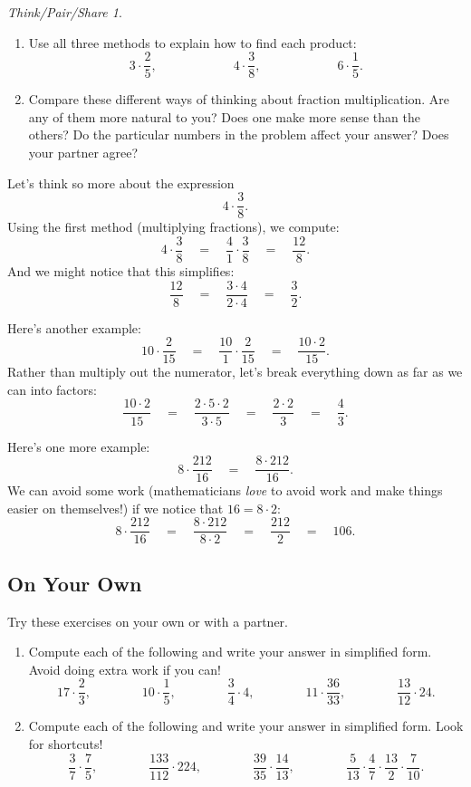 \documentclass[10pt, reqno]{amsart}
\theoremstyle{remark}
\newtheorem*{thinkpair*}{Think/Pair/Share}
\theoremstyle{definition}
\numberwithin{equation}{section}  %
\begin{document}
\begin{thinkpair*}\ 
\begin{enumerate}
\item
Use all three methods to explain how to find each product:
\[
3 \cdot \frac 2 5 ,
\qquad\qquad\qquad
4 \cdot \frac 3 8 ,
\qquad\qquad\qquad
6 \cdot \frac 1 5.
\]

\item
Compare these different ways of thinking about fraction multiplication.  Are any of them more natural to you?  Does one make more sense than the others?  Do the particular numbers in the problem affect your answer?  Does your partner agree?
\end{enumerate}
\end{thinkpair*}


Let's think so more about the expression 
\[
4 \cdot \frac 38.
\]
Using the first method (multiplying fractions), we compute:
\[
4 \cdot \frac 38 
\quad
=
\quad
 \frac 41 \cdot \frac 38
 \quad
  = 
  \quad
  \frac{12}8.
\]
And we might notice that this simplifies:
\[
\frac{12}8 
\quad
=
\quad
 \frac{3\cdot 4}{2\cdot 4} 
 \quad
 = 
 \quad
 \frac 32.
\]

Here's another example:
\[
10 \cdot \frac 2{15} 
\quad
=
\quad
 \frac{10} 1 \cdot \frac 2{15} 
\quad
= 
\quad
\frac{10\cdot 2}{15}.
\]
Rather than multiply out the numerator, let's break everything down as far as we can into factors:
\[
 \frac{10\cdot 2}{15} 
 \quad
=
\quad
\frac{2\cdot 5 \cdot 2}{3\cdot 5}
\quad
=
\quad
 \frac{2\cdot2}{3} 
 \quad
=
\quad
\frac{4}{3}.
\]



Here's one more example:
\[
8 \cdot \frac{212}{16} 
\quad
= 
\quad
\frac{8 \cdot 212}{16}.
\]
We can avoid some work (mathematicians \emph{love} to avoid work and make things easier on themselves!) if we notice that $16 = 8 \cdot 2$:
\[
8 \cdot \frac{212}{16} 
\quad
=
\quad
 \frac{8 \cdot 212}{8\cdot 2} 
 \quad
 =
 \quad
  \frac{212}{2}
  \quad
   = 
   \quad
   106.
\]

\subsection*{On Your Own}
Try these exercises on your own or with a partner.

\begin{enumerate}
\item
Compute each of the following and write your answer in simplified form.  Avoid doing extra work if you can!
\[
17 \cdot \frac 2 3,
\qquad\qquad
10 \cdot \frac 1 5 ,
\qquad\qquad
\frac 3 4 \cdot 4,
\qquad\qquad
11 \cdot \frac{36}{33},
\qquad\qquad
\frac{13}{12} \cdot 24.
\]

\item
Compute each of the following and write your answer in simplified form.  Look for shortcuts!
\[
\frac 3 7 \cdot \frac 7 5,
\qquad\qquad
\frac{133}{112} \cdot 224,
\qquad\qquad
\frac{39}{35}\cdot\frac{14}{13},
\qquad\qquad
\frac 5{13} \cdot \frac 47 \cdot \frac{13}2  \cdot \frac 7{10}.
\]
\end{enumerate}
\end{document}
